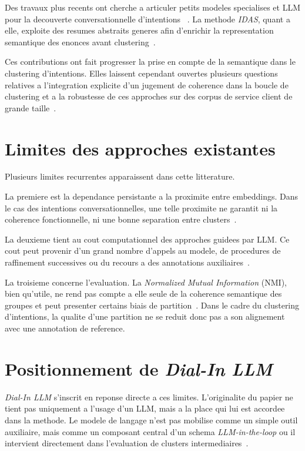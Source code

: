 Des travaux plus recents ont cherche a articuler petits modeles specialises et
LLM pour la decouverte conversationnelle d'intentions
~\cite{liang2024synergizing}. La methode \emph{IDAS}, quant a elle, exploite
des resumes abstraits generes afin d'enrichir la representation semantique des
enonces avant clustering~\cite{deraedt2023idas}.

Ces contributions ont fait progresser la prise en compte de la semantique dans
le clustering d'intentions. Elles laissent cependant ouvertes plusieurs
questions relatives a l'integration explicite d'un jugement de coherence dans
la boucle de clustering et a la robustesse de ces approches sur des corpus de
service client de grande taille~\cite{hong2025dialinllm}.

\section{Limites des approches existantes}

Plusieurs limites recurrentes apparaissent dans cette litterature.

La premiere est la dependance persistante a la proximite entre embeddings. Dans
le cas des intentions conversationnelles, une telle proximite ne garantit ni la
coherence fonctionnelle, ni une bonne separation entre
clusters~\cite{hong2025dialinllm}.

La deuxieme tient au cout computationnel des approches guidees par LLM. Ce cout
peut provenir d'un grand nombre d'appels au modele, de procedures de
raffinement successives ou du recours a des annotations
auxiliaires~\cite{zhang2023clusterllm,deraedt2023idas,viswanathan2024fewshot,feng2024llmedgerefine}.

La troisieme concerne l'evaluation. La \emph{Normalized Mutual Information}
(NMI), bien qu'utile, ne rend pas compte a elle seule de la coherence
semantique des groupes et peut presenter certains biais de
partition~\cite{jerdee2024nmi}. Dans le cadre du clustering d'intentions, la
qualite d'une partition ne se reduit donc pas a son alignement avec une
annotation de reference.

\section{Positionnement de \emph{Dial-In LLM}}

\emph{Dial-In LLM} s'inscrit en reponse directe a ces limites. L'originalite du
papier ne tient pas uniquement a l'usage d'un LLM, mais a la place qui lui est
accordee dans la methode. Le modele de langage n'est pas mobilise comme un
simple outil auxiliaire, mais comme un composant central d'un schema
\emph{LLM-in-the-loop} ou il intervient directement dans l'evaluation de
clusters intermediaires~\cite{hong2025dialinllm}.

